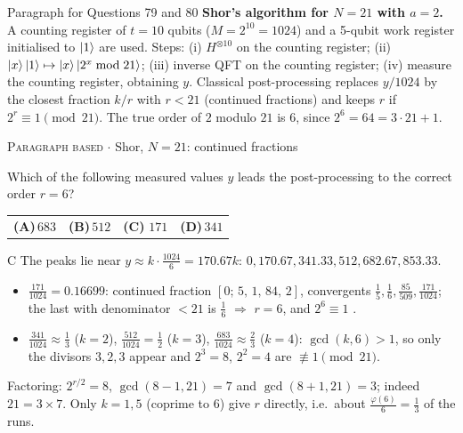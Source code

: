 \documentclass[11pt,a4paper]{article}
\newcommand{\optlabel}[1]{\textbf{(#1)}}
\newcommand{\correctlabel}[1]{\textcolor{okgreen}{\textbf{(#1)}\,\ding{51}}}
\newenvironment{qitem}[1]{\begin{list}{}{\setlength{\leftmargin}{3.3em}\setlength{\labelwidth}{3.1em}%
  \setlength{\labelsep}{0.2em}\setlength{\topsep}{3pt}\setlength{\parsep}{3pt}}\item[\textbf{Q.#1}\hfill]}{\end{list}}
\newcommand{\qsep}{\par\vspace{2pt}{\color{black!15}\hrule}\vspace{4pt}}
\newcommand{\qmeta}[2]{{\footnotesize\color{black!60}\textsc{#1} \;$\cdot$\; #2}\par}
\begin{document}
\begin{passagebox}{Paragraph for Questions 79 and 80}
\textbf{Shor's algorithm for $N = 21$ with $a = 2$.} A counting register of $t = 10$ qubits ($M = 2^{10} = 1024$) and a
5-qubit work register initialised to $\ket{1}$ are used. Steps: (i) $H^{\otimes 10}$ on the counting register;
(ii) $\ket{x}\ket{1} \mapsto \ket{x}\ket{2^x \bmod 21}$; (iii) inverse QFT on the counting register; (iv) measure the counting
register, obtaining $y$. Classical post-processing replaces $y/1024$ by the closest fraction $k/r$ with $r < 21$ (continued
fractions) and keeps $r$ if $2^r \equiv 1 \pmod{21}$. The true order of $2$ modulo $21$ is $6$, since $2^6 = 64 = 3\cdot21 + 1$.
\end{passagebox}
\begin{qitem}{79}
\qmeta{Paragraph based}{Shor, $N = 21$: continued fractions}
Which of the following measured values $y$ leads the post-processing to the correct order $r = 6$?
\par\smallskip\noindent\begin{tabularx}{\linewidth}{@{}*{4}{L}@{}}
\optlabel{A}\,$683$ & \optlabel{B}\,$512$ & \correctlabel{C}\,$171$ & \optlabel{D}\,$341$
\end{tabularx}
\end{qitem}
\begin{solbox}{C}
The peaks lie near $y \approx k\cdot\frac{1024}{6} = 170.67k$: $0, 170.67, 341.33, 512, 682.67, 853.33$.
\begin{itemize}\itemsep0pt
\item $\frac{171}{1024} = 0.16699$: continued fraction $[0;\,5,\,1,\,84,\,2]$, convergents $\frac15, \frac16, \frac{85}{509}, \frac{171}{1024}$; the last with
      denominator $< 21$ is $\frac16$ $\Rightarrow$ $r = 6$, and $2^6 \equiv 1$ \checkmark.
\item $\frac{341}{1024} \approx \frac13$ ($k = 2$), $\frac{512}{1024} = \frac12$ ($k = 3$), $\frac{683}{1024} \approx \frac23$ ($k = 4$): $\gcd(k, 6) > 1$,
      so only the divisors $3, 2, 3$ appear and $2^3 = 8$, $2^2 = 4$ are $\not\equiv 1 \pmod{21}$.
\end{itemize}
Factoring: $2^{r/2} = 8$, $\gcd(8 - 1, 21) = 7$ and $\gcd(8 + 1, 21) = 3$; indeed $21 = 3\times7$. Only $k = 1, 5$ (coprime to 6)
give $r$ directly, i.e.\ about $\frac{\varphi(6)}{6} = \frac13$ of the runs.
\end{solbox}
\qsep
\end{document}
